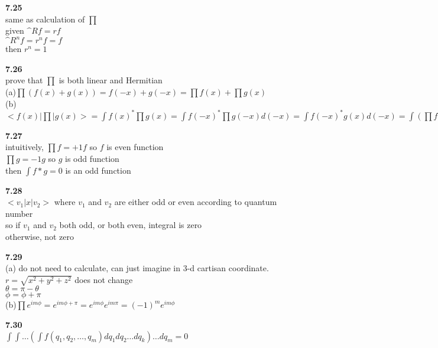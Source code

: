 \documentclass{article}
\begin{document}
\textbf{7.25}\\
same as calculation of $\prod$\\
given $\^{R}f = rf$\\
$\^{R}^nf = r^nf = f$\\
then $r^n = 1$\\
\newline

\textbf{7.26}\\
prove that $\prod$ is both linear and Hermitian\\
(a)$\prod (f(x) + g(x)) = f(-x) + g(-x) = \prod f(x) + \prod g(x)$\\
(b)$<f(x)|\prod|g(x)> = \int f(x)^*\prod g(x) = \int f(-x)^*\prod g(-x)d(-x) = \int f(-x)^*g(x)d(-x) = \int (\prod f(x))^* g(x)dx$\\
\newline

\textbf{7.27}\\
intuitively, $\prod f = +1 f$ so $f$ is even function\\
$\prod g = -1 g$ so $g$ is odd function\\
then $\int f*g = 0$ is an odd function\\
\newline

\textbf{7.28}\\
$<v_1|x|v_2>$ where $v_1$ and $v_2$ are either odd or even according to quantum number\\
so if $v_1$ and $v_2$ both odd, or both even, integral is zero\\
otherwise, not zero\\
\newline

\textbf{7.29}\\
(a) do not need to calculate, can just imagine in 3-d cartisan coordinate.\\
$r = \sqrt{x^2+y^2+z^2}$ does not change\\
$\theta = \pi - \theta$\\
$\phi = \phi + \pi$\\
(b)$\prod e^{im\phi} = e^{im{\phi + \pi}} = e^{im\phi}e^{im\pi} = (-1)^{m}e^{im\phi}$\\
\newline

\textbf{7.30}\\
$\int\int\dots(\int f(q_1,q_2,\dots,q_m)dq_1dq_2\dots dq_k)\dots dq_m = 0$\\
\newline
\end{document}
